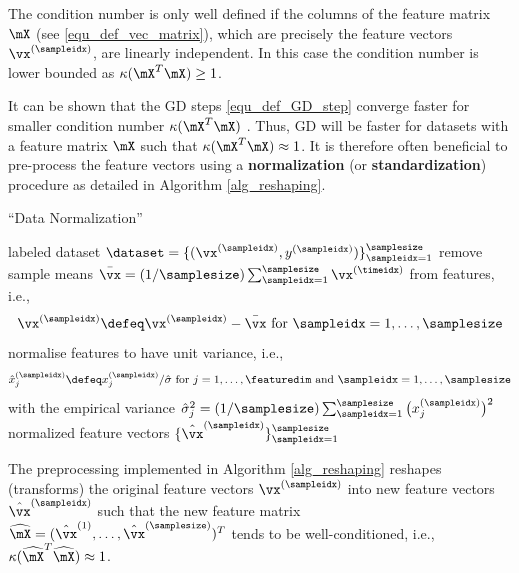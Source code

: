 \documentclass[12pt]{report}
\begin{document}
The condition number is only well defined if the columns of the feature matrix $\mX$ 
(see \eqref{equ_def_vec_matrix}), which are precisely the feature vectors $\vx^{(\sampleidx)}$, 
are linearly independent. In this case the condition number is lower bounded 
as $\kappa( \mX^{T} \mX) \geq 1$. 

It can be shown that the GD steps \eqref{equ_def_GD_step} converge faster for 
smaller condition number $\kappa( \mX^{T} \mX)$ \cite{JungFixedPoint}. Thus, GD 
will be faster for datasets with a feature matrix $\mX$ such that  $\kappa( \mX^{T} \mX) \approx 1$. 
It is therefore often beneficial to pre-process the feature vectors using a {\bf normalization} 
(or {\bf standardization}) procedure as detailed in Algorithm \ref{alg_reshaping}. 
 
 \begin{algorithm}[htbp]
\caption{``Data Normalization''}\label{alg_reshaping}
\begin{algorithmic}[1]
\renewcommand{\algorithmicrequire}{\textbf{Input:}}
\renewcommand{\algorithmicensure}{\textbf{Output:}}
\Require   labeled dataset $\dataset = \{(\vx^{(\sampleidx)},y^{(\sampleidx)})\}_{\sampleidx=1}^{\samplesize}$
\vspace*{2mm}
\State remove sample means $\bar{\vx}=(1/\samplesize) \sum_{\sampleidx=1}^{\samplesize}  \vx^{(\timeidx)}$ from features, i.e., 
 \begin{equation}
 \nonumber
 \vx^{(\sampleidx)} \defeq \vx^{(\sampleidx)} - \bar{\vx} \mbox{ for  }  \sampleidx=1,\ldots,\samplesize
 \end{equation} 
\State normalise features to have unit variance, i.e.,  
 \begin{equation} 
 \nonumber
 \hat{x}^{(\sampleidx)}_{j} \defeq x^{(\sampleidx)}_{j}/ \hat{\sigma}   \mbox{ for  } j=1,\ldots,\featuredim \mbox{ and } \sampleidx=1,\ldots,\samplesize
 \end{equation}
 with the empirical variance $\hat{\sigma}_{j}^{2}  =(1/\samplesize) \sum_{\sampleidx=1}^{\samplesize} \big( x^{(\sampleidx)}_{j} \big)^{2}$ 
\Ensure normalized feature vectors $\{\hat{\vx}^{(\sampleidx)}\}_{\sampleidx=1}^{\samplesize}$
\end{algorithmic}
\end{algorithm}
The preprocessing implemented in Algorithm \ref{alg_reshaping} reshapes (transforms) the 
original feature vectors $\vx^{(\sampleidx)}$ into new feature vectors $\hat{\vx}^{(\sampleidx)}$ 
such that the new feature matrix $\widehat{\mX} = (\hat{\vx}^{(1)},\ldots,\hat{\vx}^{(\samplesize)})^{T}$ 
tends to be well-conditioned, i.e., $\kappa( \widehat{\mX}^{T} \widehat{\mX}) \approx 1$. 
\end{document}
